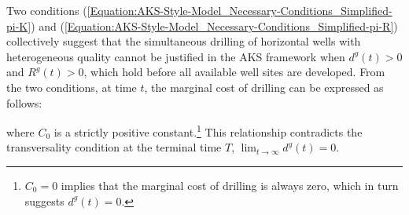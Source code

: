 Two conditions (\ref{Equation:AKS-Style-Model_Necessary-Conditions_Simplified-pi-K}) and (\ref{Equation:AKS-Style-Model_Necessary-Conditions_Simplified-pi-R}) collectively suggest that the simultaneous drilling of horizontal wells with heterogeneous quality cannot be justified in the AKS framework when $d^{g}(t) > 0$ and $R^{g}(t) > 0$, which hold before all available well sites are developed. From the two conditions, at time $t$, the marginal cost of drilling can be expressed as follows:

where $C_{0}$ is a strictly positive constant.\footnote{$C_{0} = 0$ implies that the marginal cost of drilling is always zero, which in turn suggests $d^{g}(t) = 0$.} This relationship contradicts the transversality condition at the terminal time $T$, $\lim_{t \to \infty}d^{g}(t) = 0$.
